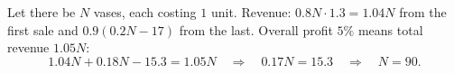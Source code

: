 Let there be $N$ vases, each costing $1$ unit. Revenue: $0.8N\cdot1.3=1.04N$ from the first sale and $0.9(0.2N-17)$ from the last. Overall profit $5\%$ means total revenue $1.05N$:
\[1.04N+0.18N-15.3=1.05N\quad\Longrightarrow\quad0.17N=15.3\quad\Longrightarrow\quad N=\boxed{90}.\]
